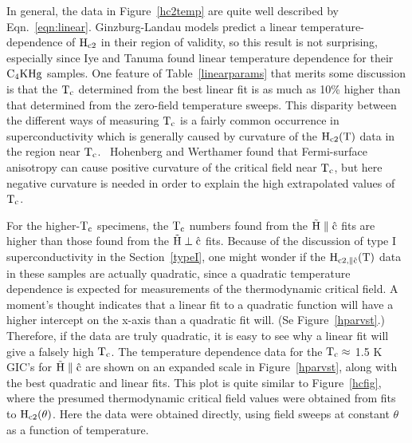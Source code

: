        In  general,  the    data  in Figure~\ref{hc2temp}  are  quite well
described by Eqn.~\ref{eqn:linear}.    Ginzburg-Landau  models  predict   a
linear temperature-dependence of $\rm H_{c2}$ in  their region of validity,
so   this  result   is   not   surprising,   especially    since  Iye   and
Tanuma\cite{iye82} found  linear  temperature  dependence   for their  $\rm
C_4KHg$ samples.  One feature  of Table~\ref{linearparams} that merits some
discussion is that the $\rm T_c$ determined from the best  linear fit is as
much as 10\%  higher than that  determined from the zero-field  temperature
sweeps.  This disparity between the  different ways of measuring  $\rm T_c$
is a fairly   common occurrence  in  superconductivity  which is  generally
caused by curvature of the  $\rm  H_{c2}(T)$  data in the  region near $\rm
T_c$.\cite{orlando79}   \ Hohenberg   and Werthamer\cite{hohenberg67} found
that Fermi-surface anisotropy can cause positive  curvature of the critical
field near $\rm T_c$,  but here  negative curvature is  needed in order  to
explain the high extrapolated values of $\rm T_c$.

        For  the higher-$\rm  T_c$ specimens, the  $\rm T_c$  numbers found
from the $\rm \vec{H} \parallel \hat{c}$ fits  are  higher than those found
from the $\rm  \vec{H} \perp  \hat{c}$ fits.   Because of the discussion of
type I superconductivity  in the Section~\ref{typeI},  one  might wonder if
the $\rm  H_{c2, \parallel \hat{c}}(T)$ data  in these samples are actually
quadratic,   since a quadratic temperature   dependence   is  expected   for
measurements of the thermodynamic  critical   field.   A moment's   thought
indicates that  a  linear fit to a quadratic   function will have  a higher
intercept on the x-axis than a quadratic fit will.  (Se Figure~\ref{hparvst}.)  Therefore, if  the data
are truly quadratic, it is easy to see why a linear fit will give  a falsely
high $\rm T_c$.  The temperature dependence  data for the $\rm T_c \approx$
1.5 K  GIC's for  $\rm \vec{H} \parallel\hat{c}$  are  shown on an expanded
scale in Figure~\ref{hparvst}, along with the best quadratic and linear fits.
This   plot is  quite   similar to    Figure~\ref{hcfig}, where the  presumed
thermodynamic  critical  field  values  were   obtained  from fits  to $\rm
H_{c2}(\theta)$.  Here  the data  were  obtained  directly,  using
field sweeps at constant $\theta$ as a function of temperature.

